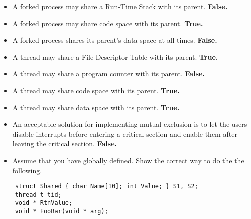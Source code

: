 \documentclass[10pt,landscape]{article}
\begin{document}
\raggedright
\footnotesize
\begin{multicols}{4}


\setlength{\premulticols}{1pt}
\setlength{\postmulticols}{1pt}
\setlength{\multicolsep}{1pt}
\setlength{\columnsep}{2pt}
\tiny
\begin{itemize}
    \item A forked process may share a Run-Time Stack with its parent. \textbf{False.}
    \item A forked process may share code space with its parent. \textbf{True.}
    \item A forked process shares its parent's data space at all times. \textbf{False.}
    \item A thread may share a File Descriptor Table with its parent. \textbf{True.}
    \item A thread may share a program counter with its parent. \textbf{False.}
    \item A thread may share code space with its parent. \textbf{True.}
    \item A thread may share data space with its parent. \textbf{True.}
    \item An acceptable solution for implementing mutual exclusion is to let the users disable interrupts before entering a critical section and enable them after leaving the critical section. \textbf{False.}
    \item Assume that you have globally defined. Show the correct way to do the the following.
\end{itemize}
\begin{verbatim}
    struct Shared { char Name[10]; int Value; } S1, S2;
    thread_t tid;
    void * RtnValue;
    void * FooBar(void * arg);
\end{verbatim}


\end{multicols}
\end{document}
